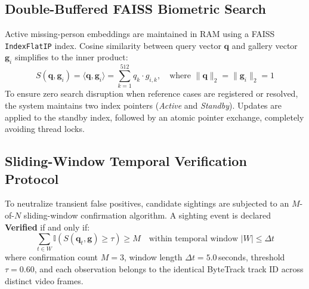 \documentclass[10pt, a4paper]{article}
\begin{document}
\subsection{Double-Buffered FAISS Biometric Search}
Active missing-person embeddings are maintained in RAM using a FAISS \texttt{IndexFlatIP} index. Cosine similarity between query vector $\mathbf{q}$ and gallery vector $\mathbf{g}_i$ simplifies to the inner product:
\begin{equation}
    S(\mathbf{q}, \mathbf{g}_i) = \langle \mathbf{q}, \mathbf{g}_i \rangle = \sum_{k=1}^{512} q_k \cdot g_{i,k}, \quad \text{where } \|\mathbf{q}\|_2 = \|\mathbf{g}_i\|_2 = 1
\end{equation}
To ensure zero search disruption when reference cases are registered or resolved, the system maintains two index pointers (\textit{Active} and \textit{Standby}). Updates are applied to the standby index, followed by an atomic pointer exchange, completely avoiding thread locks.

\subsection{Sliding-Window Temporal Verification Protocol}
To neutralize transient false positives, candidate sightings are subjected to an $M$-of-$N$ sliding-window confirmation algorithm. A sighting event is declared \textbf{Verified} if and only if:
\begin{equation}
    \sum_{t \in W} \mathbb{I}\left( S(\mathbf{q}_t, \mathbf{g}) \ge \tau \right) \ge M \quad \text{within temporal window } |W| \le \Delta t
\end{equation}
where confirmation count $M = 3$, window length $\Delta t = 5.0$\,seconds, threshold $\tau = 0.60$, and each observation belongs to the identical ByteTrack track ID across distinct video frames.
\end{document}
